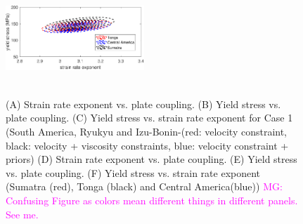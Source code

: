 \documentclass[12pt]{article}
\newcommand{\mgnote}[1]{\textcolor{magenta}{MG: #1}}
\begin{document}
\begin{figure}[H]
{\includegraphics[height=35mm,width=52mm]{fig11.pdf}%
}
\caption{(A) Strain rate exponent vs. plate coupling. 
(B) Yield stress vs. plate coupling. 
(C) Yield stress vs. strain rate exponent for Case 1 (South America, Ryukyu and Izu-Bonin-(red: velocity constraint, black: velocity + viscosity constraints, blue: velocity constraint + priors) 
(D) Strain rate exponent vs. plate coupling. 
(E) Yield stress vs. plate coupling. 
(F) Yield stress vs. strain rate exponent  (Sumatra (red), Tonga (black) and Central America(blue))
\mgnote{Confusing Figure as colors mean different things in different panels. See me.}}
\label{fig:distrib}
\end{figure}

\end{document}
